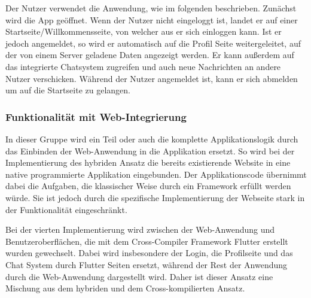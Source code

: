 Der Nutzer verwendet die Anwendung, wie im folgenden beschrieben. Zunächst wird die App geöffnet. Wenn der Nutzer nicht eingeloggt ist, landet er auf einer Startseite/Willkommensseite, von welcher aus er sich einloggen kann. Ist er jedoch angemeldet, so wird er automatisch auf die Profil Seite weitergeleitet, auf der von einem Server geladene Daten angezeigt werden. Er kann außerdem auf das integrierte Chatsystem zugreifen und auch neue Nachrichten an andere Nutzer verschicken. Während der Nutzer angemeldet ist, kann er sich abmelden um auf die Startseite zu gelangen.

\subsubsection{Funktionalität mit Web-Integrierung}
In dieser Gruppe wird ein Teil oder auch die komplette Applikationslogik durch das Einbinden der Web-Anwendung in die Applikation ersetzt. So wird bei der Implementierung des hybriden Ansatz die bereits existierende Website in eine native programmierte Applikation eingebunden. Der Applikationscode übernimmt dabei die Aufgaben, die klassischer Weise durch ein Framework erfüllt werden würde. Sie ist jedoch durch die spezifische Implementierung der Webseite stark in der Funktionalität eingeschränkt.

Bei der vierten Implementierung wird zwischen der Web-Anwendung und Benutzeroberflächen, die mit dem Cross-Compiler Framework Flutter erstellt wurden gewechselt. Dabei wird insbesondere der Login, die Profilseite und das Chat System durch Flutter Seiten ersetzt, während der Rest der Anwendung durch die Web-Anwendung dargestellt wird. Daher ist dieser Ansatz eine Mischung aus dem hybriden und dem Cross-kompilierten Ansatz.


